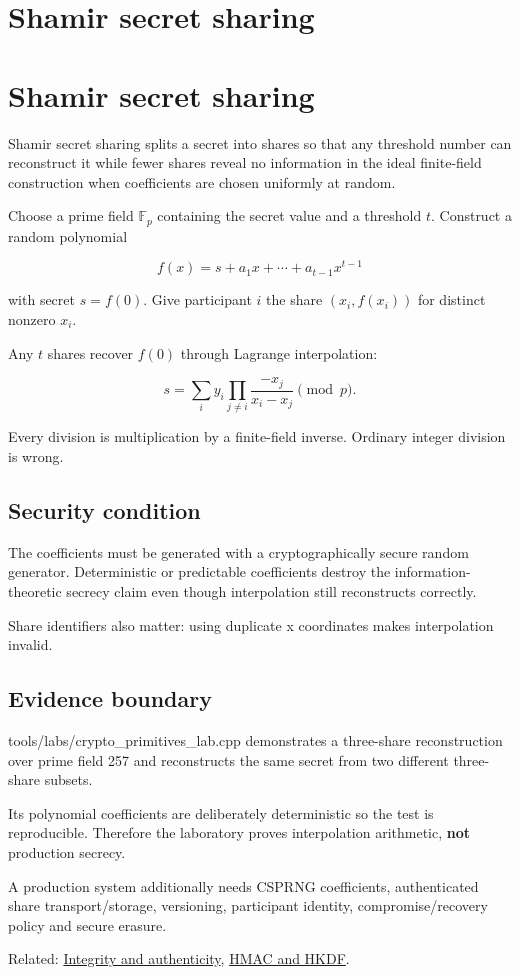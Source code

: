 \hypertarget{appendix-5888fd6102dc}{}
\section*{Shamir secret sharing}
\section{Shamir secret sharing}\label{shamir-secret-sharing}

Shamir secret sharing splits a secret into shares so that any threshold number can reconstruct it while fewer shares reveal no information in the ideal finite-field construction when coefficients are chosen uniformly at random.

Choose a prime field \(\mathbb F_p\) containing the secret value and a threshold \(t\). Construct a random polynomial

\[
f(x)=s+a_1x+\cdots+a_{t-1}x^{t-1}
\]

with secret \(s=f(0)\). Give participant \(i\) the share \((x_i,f(x_i))\) for distinct nonzero \(x_i\).

Any \(t\) shares recover \(f(0)\) through Lagrange interpolation:

\[
s=
\sum_i y_i
\prod_{j\ne i}
\frac{-x_j}{x_i-x_j}
\pmod p.
\]

Every division is multiplication by a finite-field inverse. Ordinary integer division is wrong.

\subsection{Security condition}\label{security-condition}

The coefficients must be generated with a cryptographically secure random generator. Deterministic or predictable coefficients destroy the information-theoretic secrecy claim even though interpolation still reconstructs correctly.

Share identifiers also matter: using duplicate x coordinates makes interpolation invalid.

\subsection{Evidence boundary}\label{evidence-boundary}

tools/labs/crypto\_primitives\_lab.cpp demonstrates a three-share reconstruction over prime field 257 and reconstructs the same secret from two different three-share subsets.

Its polynomial coefficients are deliberately deterministic so the test is reproducible. Therefore the laboratory proves interpolation arithmetic, \textbf{not} production secrecy.

A production system additionally needs CSPRNG coefficients, authenticated share transport/storage, versioning, participant identity, compromise/recovery policy and secure erasure.

Related: \hyperref[appendix-cbe594d1ab0a]{Integrity and authenticity}, \hyperref[appendix-50af792c9da7]{HMAC and HKDF}.
